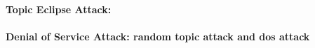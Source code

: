 

\paragraph{\bf{Topic Eclipse Attack:}}

%
%
%

\paragraph{\bf{Denial of Service Attack: random topic attack and dos attack}}



%
%


%
%

%
